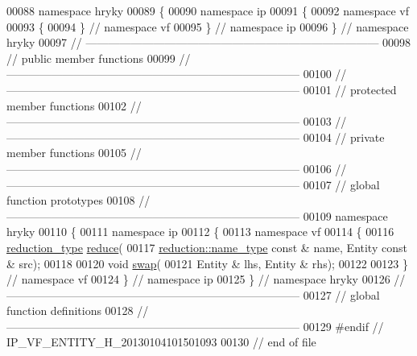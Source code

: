 \begin{DoxyCode}
00088 \textcolor{keyword}{namespace }hryky
00089 \{
00090 \textcolor{keyword}{namespace }ip
00091 \{
00092 \textcolor{keyword}{namespace }vf
00093 \{
00094 \} \textcolor{comment}{// namespace vf}
00095 \} \textcolor{comment}{// namespace ip}
00096 \} \textcolor{comment}{// namespace hryky}
00097 \textcolor{comment}{//
      ------------------------------------------------------------------------------}
00098 \textcolor{comment}{// public member functions}
00099 \textcolor{comment}{//
      ------------------------------------------------------------------------------}
00100 \textcolor{comment}{//
      ------------------------------------------------------------------------------}
00101 \textcolor{comment}{// protected member functions}
00102 \textcolor{comment}{//
      ------------------------------------------------------------------------------}
00103 \textcolor{comment}{//
      ------------------------------------------------------------------------------}
00104 \textcolor{comment}{// private member functions}
00105 \textcolor{comment}{//
      ------------------------------------------------------------------------------}
00106 \textcolor{comment}{//
      ------------------------------------------------------------------------------}
00107 \textcolor{comment}{// global function prototypes}
00108 \textcolor{comment}{//
      ------------------------------------------------------------------------------}
00109 \textcolor{keyword}{namespace }hryky
00110 \{
00111 \textcolor{keyword}{namespace }ip
00112 \{
00113 \textcolor{keyword}{namespace }vf
00114 \{
00116     \hyperlink{namespacehryky_a343a9a4c36a586be5c2693156200eadc}{reduction_type} \hyperlink{namespacehryky_af41cb3af6766761da0ff21b84527a52c}{reduce}(
00117         \hyperlink{namespacehryky_1_1reduction_ac686c30a4c8d196bbd0f05629a6b921f}{reduction::name_type} \textcolor{keyword}{const} & name, Entity \textcolor{keyword}{const} & src);
00118 
00120     \textcolor{keywordtype}{void} \hyperlink{namespacehryky_a4282146df5ea2b68cb667896a2205909}{swap}(
00121         Entity & lhs, Entity & rhs);
00122 
00123 \} \textcolor{comment}{// namespace vf}
00124 \} \textcolor{comment}{// namespace ip}
00125 \} \textcolor{comment}{// namespace hryky}
00126 \textcolor{comment}{//
      ------------------------------------------------------------------------------}
00127 \textcolor{comment}{// global function definitions}
00128 \textcolor{comment}{//
      ------------------------------------------------------------------------------}
00129 \textcolor{preprocessor}{#endif // IP\_VF\_ENTITY\_H\_20130104101501093}
00130 \textcolor{preprocessor}{}\textcolor{comment}{// end of file}
\end{DoxyCode}
